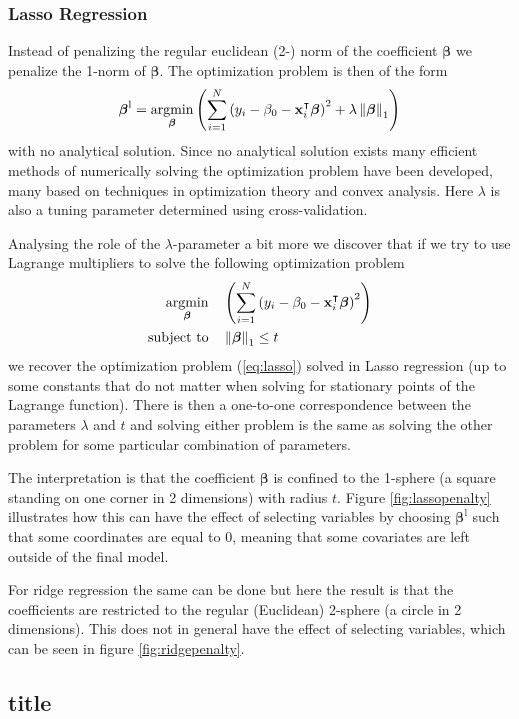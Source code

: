 \documentclass[a4paper, 12pt]{scrartcl}
\newcommand{\bfbeta}{\boldsymbol{\beta}}
\begin{document}

\subsubsection*{Lasso Regression}
\begin{algorithm}
Instead of penalizing the regular euclidean (2-) norm of the coefficient $\bfbeta$ we penalize the 1-norm of $\bfbeta$.
The optimization problem is then of the form
\begin{equation}\label{eq:lasso}
	\bfbeta^\mathrm{l}=\operatornamewithlimits{argmin}_{\bfbeta}\left(\sum_{i=1}^{N}\left(y_i-\beta_0-\mathbf{x}_i^\intercal\bfbeta\right)^2+\lambda\left\|\bfbeta\right\|_1\right)
\end{equation}
with no analytical solution.
Since no analytical solution exists many efficient methods of numerically solving the optimization problem have been developed, many based on techniques in optimization theory and convex analysis.
Here $\lambda$ is also a tuning parameter determined using cross-validation.
\end{algorithm}

Analysing the role of the $\lambda$-parameter a bit more we discover that if we try to use Lagrange multipliers to solve the following optimization problem
\begin{equation*}
	\begin{aligned}
	\operatornamewithlimits{argmin}_{\bfbeta} & & &\left(\sum_{i=1}^{N}\left(y_i-\beta_0-\mathbf{x}_i^\intercal\bfbeta\right)^2\right)\\
	\text{subject to} & & & \left\|\bfbeta\right\|_1 \leq t
	\end{aligned}
\end{equation*}
we recover the optimization problem (\ref{eq:lasso}) solved in Lasso regression (up to some constants that do not matter when solving for stationary points of the Lagrange function).
There is then a one-to-one correspondence between the parameters $\lambda$ and $t$ and solving either problem is the same as solving the other problem for some particular combination of parameters.

The interpretation is that the coefficient $\bfbeta$ is confined to the 1-sphere (a square standing on one corner in 2 dimensions) with radius $t$.
Figure \ref{fig:lassopenalty} illustrates how this can have the effect of selecting variables by choosing $\bfbeta^\mathrm{l}$ such that some coordinates are equal to 0, meaning that some covariates are left outside of the final model.

For ridge regression the same can be done but here the result is that the coefficients are restricted to the regular (Euclidean) 2-sphere (a circle in 2 dimensions).
This does not in general have the effect of selecting variables, which can be seen in figure \ref{fig:ridgepenalty}.

\subsection{title}
\end{document}

